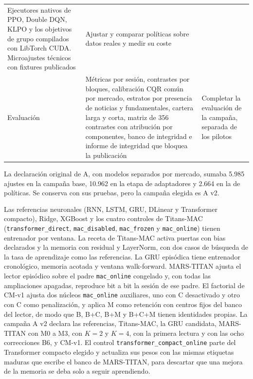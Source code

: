 \documentclass[11pt,a4paper]{report}
\begin{document}
\begin{table}[htbp]
\begin{tabular}{L{2.6cm}L{5.6cm}L{4.8cm}}
Ejecutores nativos de PPO, Double DQN, KLPO y los objetivos de grupo compilados
con LibTorch CUDA. Microajustes técnicos con fixtures publicados & Ajustar y
comparar políticas sobre datos reales y medir su coste \\
Evaluación & Métricas por sesión, contrastes por bloques, calibración CQR
común por mercado, estratos por presencia de noticias y fundamentales, cartera
larga y corta, matriz de 356 contrastes con atribución por componentes, banco
de integridad e informe de integridad que bloquea la publicación & Completar la
evaluación de la campaña, separada de los pilotos \\
\bottomrule
\end{tabular}
\end{table}

La declaración original de A, con modelos separados por mercado, sumaba 5.985
ajustes en la campaña base, 10.962 en la etapa de adaptadores y 2.664 en la de
políticas. Se conserva con sus pruebas, pero la campaña elegida es A v2.

Las referencias neuronales (RNN, LSTM, GRU, DLinear y Transformer compacto),
Ridge, XGBoost y los cuatro controles de Titans-MAC
(\texttt{transformer\_direct}, \texttt{mac\_disabled}, \texttt{mac\_frozen} y
\texttt{mac\_online}) tienen entrenador por ventana. La receta de Titans-MAC
activa puertas con bias declarados y la memoria con residual y LayerNorm, con
dos casos de búsqueda de la tasa de aprendizaje como las referencias. La GRU
episódica tiene entrenador cronológico, memoria acotada y ventana
walk-forward. MARS-TITAN ajusta el lector episódico sobre el padre
\texttt{mac\_online} congelado y, con todas las ampliaciones apagadas,
reproduce bit a bit la sesión de ese padre. El factorial de CM-v1 ajusta dos
núcleos \texttt{mac\_online} auxiliares, uno con C desactivado y otro con C
como penalización, y aplica M como retención con centros fijos del banco del
lector, de modo que B, B+C, B+M y B+C+M tienen identidades propias. La
campaña A v2 declara las referencias, Titans-MAC, la GRU candidata,
MARS-TITAN con M0 a M3, con $K=2$ y $K=4$, con la primera lectura y con las
ocho correcciones B6, y CM-v1. El control
\texttt{transformer\_compact\_online} parte del Transformer compacto elegido y
actualiza sus pesos con las mismas etiquetas maduras que escribe el banco de
MARS-TITAN, para descartar que una mejora de la memoria se deba solo a seguir
aprendiendo.
\end{document}

